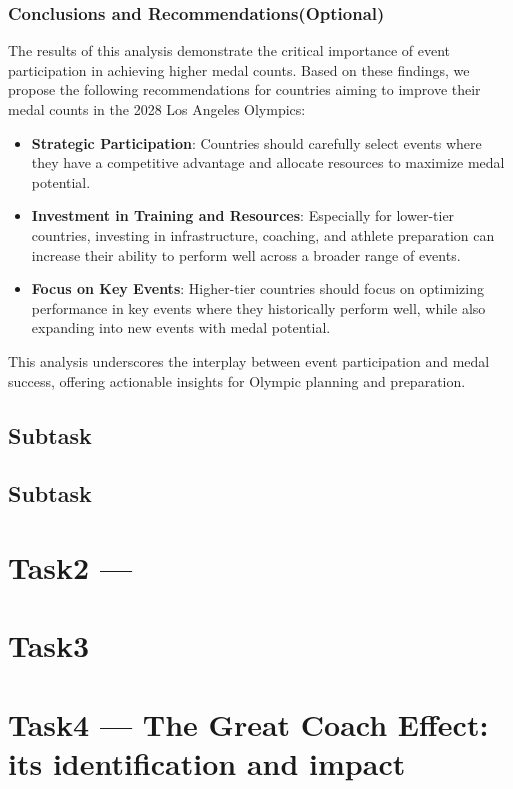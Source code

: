 \documentclass{mcmthesis}
\begin{document}
\subsubsection{Conclusions and Recommendations(Optional)}
The results of this analysis demonstrate the critical importance of event participation in achieving higher medal counts. Based on these findings, we propose the following recommendations for countries aiming to improve their medal counts in the 2028 Los Angeles Olympics:
\begin{itemize}
    \item \textbf{Strategic Participation}: Countries should carefully select events where they have a competitive advantage and allocate resources to maximize medal potential.
    \item \textbf{Investment in Training and Resources}: Especially for lower-tier countries, investing in infrastructure, coaching, and athlete preparation can increase their ability to perform well across a broader range of events.
    \item \textbf{Focus on Key Events}: Higher-tier countries should focus on optimizing performance in key events where they historically perform well, while also expanding into new events with medal potential.
\end{itemize}
This analysis underscores the interplay between event participation and medal success, offering actionable insights for Olympic planning and preparation.

\subsection{Subtask}

\subsection{Subtask}
\section{Task2 --- }

\section{Task3}

\section{Task4 --- The Great Coach Effect: its identification and impact}
\end{document}
